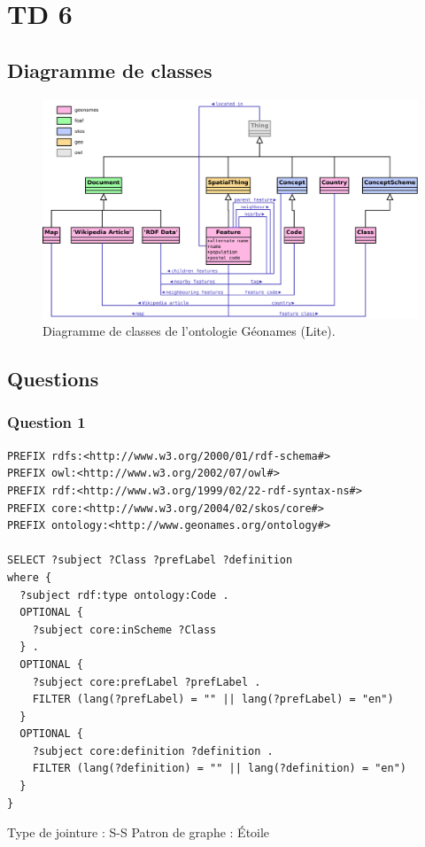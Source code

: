 \section{TD 6}
\subsection{Diagramme de classes}
\begin{figure}[H]
  \includegraphics[width=\textwidth]{../diag_class}
  \caption{Diagramme de classes de l'ontologie Géonames (Lite).}
\end{figure}
\subsection{Questions}
\subsubsection{Question 1}
\begin{verbatim}
PREFIX rdfs:<http://www.w3.org/2000/01/rdf-schema#>
PREFIX owl:<http://www.w3.org/2002/07/owl#>
PREFIX rdf:<http://www.w3.org/1999/02/22-rdf-syntax-ns#>
PREFIX core:<http://www.w3.org/2004/02/skos/core#>
PREFIX ontology:<http://www.geonames.org/ontology#>

SELECT ?subject ?Class ?prefLabel ?definition
where {
  ?subject rdf:type ontology:Code .
  OPTIONAL {
    ?subject core:inScheme ?Class
  } .
  OPTIONAL {
    ?subject core:prefLabel ?prefLabel .
    FILTER (lang(?prefLabel) = "" || lang(?prefLabel) = "en")
  }
  OPTIONAL {
    ?subject core:definition ?definition .
    FILTER (lang(?definition) = "" || lang(?definition) = "en")
  }
}
\end{verbatim}
Type de jointure : S-S Patron de graphe : Étoile
